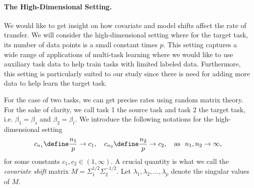 




\paragraph{The High-Dimensional Setting.}
We would like to get insight on how covariate and model shifts affect the rate of transfer.
We will consider the high-dimensional setting where for the target task, its number of data points is a small constant times $p$.
This setting captures a wide range of applications of multi-task learning where we would like to use auxiliary task data to help train tasks with limited labeled data.
Furthermore, this setting is particularly suited to our study since there is need for adding more data to help learn the target task.

For the case of two tasks, we can get precise rates using random matrix theory.
For the sake of clarity, we call task 1 the source task and task 2 the target task,
i.e. $\beta_1 = \beta_s$ and $\beta_2 = \beta_t$.
We introduce the following notations for the high-dimensional setting
\[ c_{n_1} \define \frac{n_1}{p} \to c_1, \quad c_{n_2} \define \frac{n_2}p \to c_2, \quad \text{as } \ n_1, n_2\to \infty, \]
for some constants $c_1, c_2 \in (1,\infty)$.
A crucial quantity is what we call the \textit{covariate shift} matrix $M = \Sigma_1^{1/2}\Sigma_2^{-1/2}$.
Let $\lambda_1, \lambda_2, \dots, \lambda_p$ denote the singular values of $M$.

